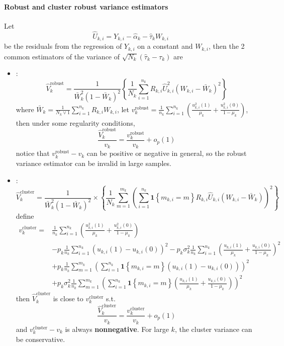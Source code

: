 \documentclass[twoside]{article}
\begin{document}
\paragraph*{Robust and cluster robust variance estimators} Let $$ \hat{U}_{k,i} = Y_{k,i}-\hat{\alpha}_k - \hat{\tau}_kW_{k,i} $$ be the residuals from the regression of $Y_{k,i}$ on a constant and $W_{k,i}$, then the 2 common estimators of the variance of $\sqrt{N_k}\left(\hat{\tau}_k-\tau_k\right)$ are
\begin{itemize}
    \item {}: 
    \begin{equation*}
        \hat{V}_k^{\mathrm{robust}} = \frac{1}{\bar{W}^2_k\left(1-\bar{W}_k\right)^2} \left\{ \frac{1}{N_k}\sum^{n_k}_{i=1} R_{k,i}\hat{U}_{k,i}^2 \left(W_{k,i}-\bar{W}_k\right)^2 \right\}
    \end{equation*}
    where $ \bar{W}_k = \frac{1}{N_k\vee 1} \sum^{n_k}_{i=1}R_{k,i}W_{k,i} $, let $v_k^{\text{robust}} = \frac{1}{n_k} \sum^{n_k}_{i=1}\left(\frac{u^2_{k,i}(1)}{\mu_k} + \frac{u^2_{k,i}(0)}{1-\mu_k}\right)$, then under some regularity conditions, 
    $$ \frac{\hat{V}_k^{\text{robust}}}{v_k} = \frac{v_k^{\text{robust}}}{v_k} + o_p(1) $$
    notice that $v_k^{\text{robust}} - v_k$ can be positive or negative in general, so the robust variance estimator can be invalid in large samples.
    \item {}: 
    \begin{equation*}
        \hat{V}^{\text{cluster}}_k = \frac{1}{\bar{W}^2_k(1-\bar{W}_k)^2} \times \left\{ \frac{1}{N_k} \sum^{m_k}_{m=1}\left( \sum^{n_k}_{i=1} \mathbf{1}\left\{m_{k,i}=m\right\} R_{k,i}\hat{U}_{k,i} \left(W_{k,i}-\bar{W}_k\right) \right)^2 \right\}
    \end{equation*}
    define
    \begin{align*}
        v_k^{\text{cluster}} =& \frac{1}{n_k} \sum^{n_k}_{i=1}\left( \frac{u_{k,i}^2(1)}{\mu_k} + \frac{u^2_{k,i}(0)}{1-\mu_k} \right)\\
        &-p_k \frac{1}{n_k} \sum^{n_k}_{i=1}\left(u_{k,i}(1)-u_{k,i}(0)\right)^2 - p_k\sigma^2_k \frac{1}{n_k} \sum^{n_k}_{i=1} \left( \frac{u_{k,i}(1)}{\mu_k} + \frac{u_{k,i}(0)}{1-\mu_k} \right)^2 \\
        &+ p_k \frac{1}{n_k}\sum^{m_k}_{m=1}\left(\sum^{n_k}_{i=1} \mathbf{1}\left\{m_{k,i}=m\right\} \left(u_{k,i}(1)-u_{k,i}(0)\right) \right)^2\\
        &+ p_k\sigma^2_k \frac{1}{n_k}\sum^{m_k}_{m=1} \left(\sum^{n_k}_{i=1} \mathbf{1}\left\{m_{k,i}=m\right\} \left(\frac{u_{k,i}(1)}{\mu_k} + \frac{u_{k,i}(0)}{1-\mu_k}\right)\right)^2
    \end{align*}
    then $\hat{V}^{\text{cluster}}_k$ is close to $v_k^{\text{cluster}}$ s.t. $$ \frac{\hat{V}_k^{\text{cluster}}}{v_k} = \frac{v_k^{\text{cluster}}}{v_k} + o_p(1) $$
    and $v_k^{\text{cluster}}-v_k$ is always \textbf{nonnegative}. For large $k$, the cluster variance can be conservative.
\end{itemize}
\end{document}
